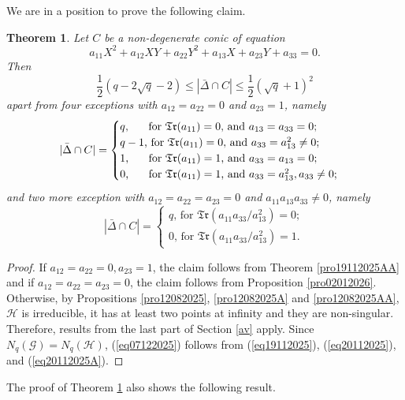 \documentclass[sn-mathphys-num]{sn-jnl}%
\newtheorem{theorem}{Theorem}
\begin{document}
We are in a position to prove the following claim.
\begin{theorem}
\label{th05112025}
Let $C$ be a non-degenerate conic of equation
$$a_{11}X^2+a_{12}XY+a_{22}Y^2+a_{13}X+a_{23}Y+a_{33}=0.$$
Then 
\begin{equation}
\label{eq07122025}
\textstyle{\frac{1}{2}}(q-2\sqrt{q}-2)\le
|\bar{\Delta}\cap C|\le \textstyle{\frac{1}{2}}(\sqrt{q}+1)^2
\end{equation}
apart from four exceptions with $a_{12}=a_{22}=0$ and $a_{23}=1$, namely 
$$|\bar{\Delta}\cap C|=
\begin{cases}
\mbox{$q$, \quad \,\,\,for $\mathfrak{Tr}(a_{11})=0$, and   $a_{13}=a_{33}=0$;}\\
\mbox{$q-1$, for $\mathfrak{Tr}(a_{11})=0,$ and $a_{33}=a_{13}^2\ne 0$};\\
\mbox{$1$,\quad \,\,\,  for $\mathfrak{Tr}(a_{11})=1$,   and $a_{33}=a_{13}=0$};\\
\mbox{$0$,\quad \,\,\, for $\mathfrak{Tr}(a_{11})=1$,   and $a_{33}=a_{13}^2, a_{33}\ne 0$};\\ 
\end{cases}
$$
and two more exception with $a_{12}=a_{22}=a_{23}=0$ and $a_{11}a_{13}a_{33}\ne 0$, namely
$$|\bar{\Delta}\cap C|=
\begin{cases}
{\mbox{$q$, for $\mathfrak{Tr}(a_{11}a_{33}/a_{13}^2)=0$}};\\
{\mbox{$0$, for $\mathfrak{Tr}(a_{11}a_{33}/a_{13}^2)=1$}}.
\end{cases}
$$
\end{theorem}
\begin{proof}
 If $a_{12}=a_{22}=0, a_{23}=1$, the claim follows from Theorem \ref{pro19112025AA} and if $a_{12}=a_{22}=a_{23}=0$, the claim follows from Proposition \ref{pro02012026}. Otherwise, by Propositions \ref{pro12082025}, \ref{pro12082025A} and \ref{pro12082025AA}, $\mathcal{H}$ is irreducible, it has at least two points at infinity and they are non-singular. Therefore, results from the last part of Section \ref{av} apply. Since $N_q(\mathcal{G})=N_q(\mathcal{H})$,  (\ref{eq07122025})  follows from (\ref{eq19112025}), (\ref{eq20112025}), and (\ref{eq20112025A}).
 \end{proof}
The proof of Theorem \ref{th05112025} also shows the following result.
\end{document}
